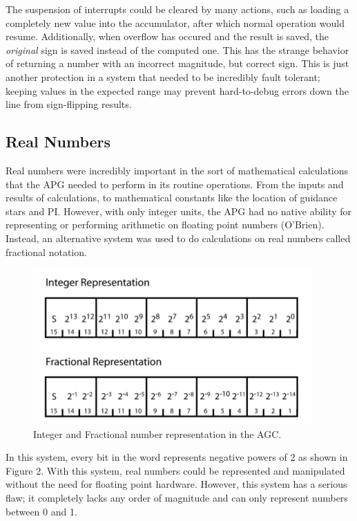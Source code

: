\documentclass[a4paper,11pt]{article}
\begin{document}
The suspension of interrupts could be cleared by many actions, such as loading a completely new value into the accumulator, after which normal operation would resume.  Additionally, when overflow has occured and the result is saved, the {\it original} sign is saved instead of the computed one.  This has the strange behavior of returning a number with an incorrect magnitude, but correct sign.  This is just another protection in a system that needed to be incredibly fault tolerant; keeping values in the expected range may prevent hard-to-debug errors down the line from sign-flipping results.

\subsection{Real Numbers}
Real numbers were incredibly important in the sort of mathematical calculations that the APG needed to perform in its routine operations.  From the inputs and results of calculations, to mathematical constants like the location of guidance stars and PI.  However, with only integer units, the APG had no native ability for representing or performing arithmetic on floating point numbers (O'Brien).   Instead, an alternative system was used to do calculations on real numbers called fractional notation.

\begin{figure}[h!]
\caption{Integer and Fractional number representation in the AGC.} 
\centering
\includegraphics[width=.8\textwidth]{apg_numbers.png} 
\end{figure}
\vspace{0.02cm}

In this system, every bit in the word represents negative powers of 2 as shown in Figure 2.  With this system, real numbers could be represented and manipulated without the need for floating point hardware.  However, this system has a serious flaw; it completely lacks any order of magnitude and can only represent numbers between 0 and 1.
\end{document}
